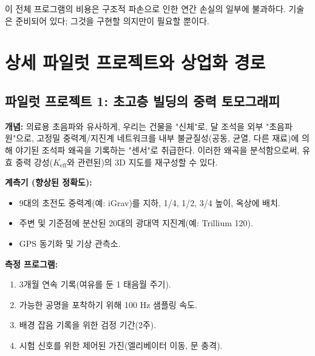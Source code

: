 \documentclass[12pt,a4paper]{article}
\theoremstyle{remark}
\newcommand{\Keff}{K_{\mathrm{eff}}}
\begin{document}
	이 전체 프로그램의 비용은 구조적 파손으로 인한 연간 손실의 일부에 불과하다. 기술은 준비되어 있다; 그것을 구현할 의지만이 필요할 뿐이다.
	
	\section{상세 파일럿 프로젝트와 상업화 경로}
	
	\subsection{파일럿 프로젝트 1: 초고층 빌딩의 중력 토모그래피}
	
	\textbf{개념:} 의료용 초음파와 유사하게, 우리는 건물을 "신체"로, 달 조석을 외부 "초음파원"으로, 고정밀 중력계/지진계 네트워크를 내부 불균질성(공동, 균열, 다른 재료)에 의해 야기된 조석파 왜곡을 기록하는 "센서"로 취급한다. 이러한 왜곡을 분석함으로써, 유효 중력 강성(\(\Keff\)와 관련된)의 3D 지도를 재구성할 수 있다.
	
	\textbf{계측기 (향상된 정확도):}
	\begin{itemize}
		\item 9대의 초전도 중력계(예: iGrav)를 지하, 1/4, 1/2, 3/4 높이, 옥상에 배치.
		\item 주변 및 기준점에 분산된 20대의 광대역 지진계(예: Trillium 120).
		\item GPS 동기화 및 기상 관측소.
	\end{itemize}
	
	\textbf{측정 프로그램:}
	\begin{enumerate}
		\item 3개월 연속 기록(여유를 둔 1 태음월 주기).
		\item 가능한 공명을 포착하기 위해 100 Hz 샘플링 속도.
		\item 배경 잡음 기록을 위한 검정 기간(2주).
		\item 시험 신호를 위한 제어된 가진(엘리베이터 이동, 문 충격).
	\end{enumerate}
	
\end{document}
